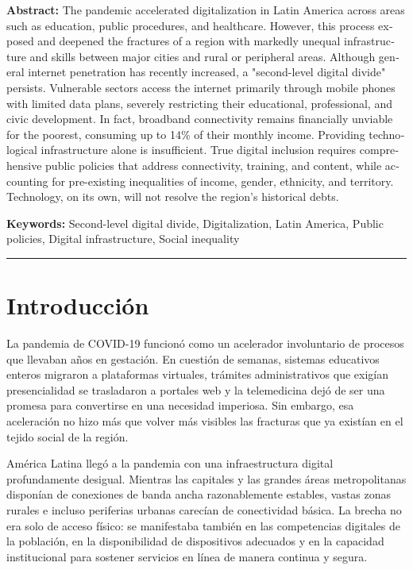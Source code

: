 \begin{tcolorbox}[colback=brown!8!white,colframe=brown!8!white,boxrule=0pt,arc=2pt,left=4pt,right=4pt,top=3pt,bottom=3pt,before skip=4pt,after skip=4pt]
\begin{otherlanguage}{english}
\sffamily\small \textbf{Abstract:} The pandemic accelerated digitalization in Latin America across areas such as education, public procedures, and healthcare. However, this process exposed and deepened the fractures of a region with markedly unequal infrastructure and skills between major cities and rural or peripheral areas.
Although general internet penetration has recently increased, a "second-level digital divide" persists. Vulnerable sectors access the internet primarily through mobile phones with limited data plans, severely restricting their educational, professional, and civic development. In fact, broadband connectivity remains financially unviable for the poorest, consuming up to 14\% of their monthly income.
Providing technological infrastructure alone is insufficient. True digital inclusion requires comprehensive public policies that address connectivity, training, and content, while accounting for pre-existing inequalities of income, gender, ethnicity, and territory. Technology, on its own, will not resolve the region's historical debts.
\par\smallskip\noindent\textbf{Keywords:} Second-level digital divide, Digitalization, Latin America, Public policies, Digital infrastructure, Social inequality
\end{otherlanguage}
\end{tcolorbox}

\bigskip
\noindent\rule{\linewidth}{0.4pt}
\bigskip

\section{Introducción}
La pandemia de COVID-19 funcionó como un acelerador involuntario de procesos que llevaban años en gestación. En cuestión de semanas, sistemas educativos enteros migraron a plataformas virtuales, trámites administrativos que exigían presencialidad se trasladaron a portales web y la telemedicina dejó de ser una promesa para convertirse en una necesidad imperiosa. Sin embargo, esa aceleración no hizo más que volver más visibles las fracturas que ya existían en el tejido social de la región.

América Latina llegó a la pandemia con una infraestructura digital profundamente desigual. Mientras las capitales y las grandes áreas metropolitanas disponían de conexiones de banda ancha razonablemente estables, vastas zonas rurales e incluso periferias urbanas carecían de conectividad básica. La brecha no era solo de acceso físico: se manifestaba también en las competencias digitales de la población, en la disponibilidad de dispositivos adecuados y en la capacidad institucional para sostener servicios en línea de manera continua y segura.

